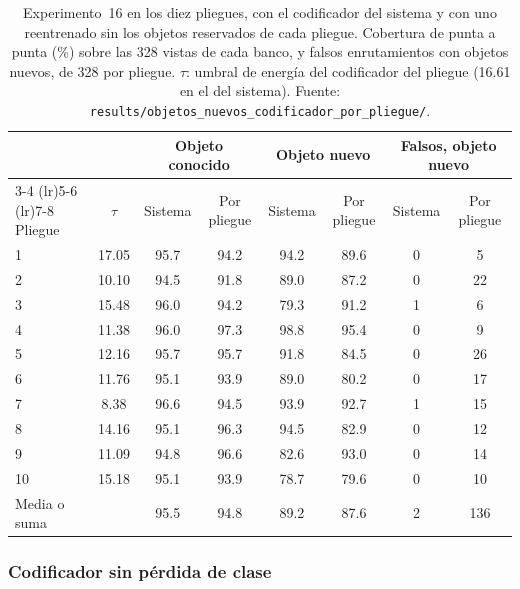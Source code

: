 \begin{table}[H]
    \centering
    \caption[Objetos nuevos por pliegue, con el codificador del sistema y uno reentrenado]{Experimento~16 en los diez pliegues, con el codificador del sistema y
    con uno reentrenado sin los objetos reservados de cada pliegue.
    Cobertura de punta a punta (\%) sobre las 328 vistas de
    cada banco, y falsos enrutamientos con objetos nuevos, de 328 por pliegue. $\tau$:
    umbral de energía del codificador del pliegue (16.61 en el del sistema). Fuente:
    \texttt{results/objetos\_nuevos\_codificador\_por\_pliegue/}.}
    \label{tab:objetos-nuevos-pliegue}
    \small
    \setlength{\tabcolsep}{4pt}
    \begin{tabular}{lccccccc}
        \toprule
        & & \multicolumn{2}{c}{Objeto conocido} & \multicolumn{2}{c}{Objeto nuevo}
          & \multicolumn{2}{c}{Falsos, objeto nuevo} \\
        \cmidrule(lr){3-4} \cmidrule(lr){5-6} \cmidrule(lr){7-8}
        Pliegue & $\tau$ & Sistema & Por pliegue & Sistema & Por pliegue & Sistema & Por pliegue \\
        \midrule
        1 & 17.05 & 95.7 & 94.2 & 94.2 & 89.6 & 0 & 5  \\
        2 & 10.10 & 94.5 & 91.8 & 89.0 & 87.2 & 0 & 22 \\
        3 & 15.48 & 96.0 & 94.2 & 79.3 & 91.2 & 1 & 6  \\
        4 & 11.38 & 96.0 & 97.3 & 98.8 & 95.4 & 0 & 9  \\
        5 & 12.16 & 95.7 & 95.7 & 91.8 & 84.5 & 0 & 26 \\
        6 & 11.76 & 95.1 & 93.9 & 89.0 & 80.2 & 0 & 17 \\
        7 &  8.38 & 96.6 & 94.5 & 93.9 & 92.7 & 1 & 15 \\
        8 & 14.16 & 95.1 & 96.3 & 94.5 & 82.9 & 0 & 12 \\
        9 & 11.09 & 94.8 & 96.6 & 82.6 & 93.0 & 0 & 14 \\
        10 & 15.18 & 95.1 & 93.9 & 78.7 & 79.6 & 0 & 10 \\
        \midrule
        Media o suma & & 95.5 & 94.8 & 89.2 & 87.6 & 2 & 136 \\
        \bottomrule
    \end{tabular}
\end{table}

\subsubsection{Codificador sin pérdida de clase}
\label{sec:codificador-sin-clase}

